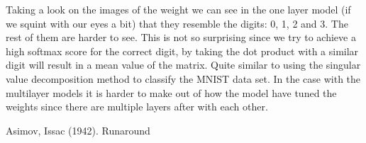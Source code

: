 \documentclass[a4paper,10pt]{article}
\begin{document}
Taking a look on the images of the weight we can see in the one layer model (if we squint with our eyes a bit) that they resemble the digits: 0, 1, 2 and 3. The rest of them are harder to see. This is not so surprising since we try to achieve a high softmax score for the correct digit, by taking the dot product with a similar digit will result in a mean value of the matrix. Quite similar to using the singular value decomposition method to classify the MNIST data set. In the case with the multilayer models it is harder to make out of how the model have tuned the weights since there are multiple layers after with each other.   


\begin{thebibliography}{1}

 Asimov, Issac (1942). Runaround

\end{thebibliography}
\end{document}
